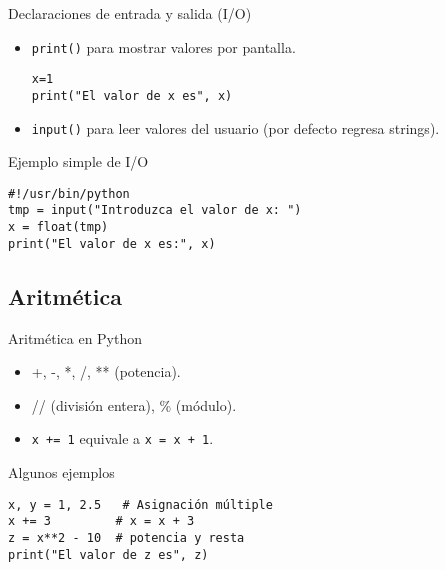 \documentclass[10pt]{beamer}
\begin{document}
\begin{frame}[fragile]{Declaraciones de entrada y salida (I/O)}
\begin{itemize}
	\item \texttt{print()} para mostrar valores por pantalla.
	\begin{verbatim}
x=1
print("El valor de x es", x)
	\end{verbatim}
	\item \texttt{input()} para leer valores del usuario (por defecto regresa strings).
\end{itemize}
\end{frame}

\begin{frame}[fragile]{Ejemplo simple de I/O}
\begin{verbatim}
#!/usr/bin/python
tmp = input("Introduzca el valor de x: ")
x = float(tmp)
print("El valor de x es:", x)
\end{verbatim}
\end{frame}

\subsection{Aritmética}

\begin{frame}{Aritmética en Python}
\begin{itemize}
	\item +, -, *, /, ** (potencia).
	\item // (división entera), \% (módulo).
	\item \texttt{x += 1} equivale a \texttt{x = x + 1}.
\end{itemize}
\end{frame}

\begin{frame}[fragile]{Algunos ejemplos}
\begin{verbatim}
x, y = 1, 2.5   # Asignación múltiple
x += 3         # x = x + 3
z = x**2 - 10  # potencia y resta
print("El valor de z es", z)
\end{verbatim}
\end{frame}
\end{document}
